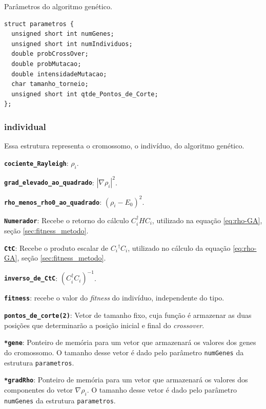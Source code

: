 	Parâmetros do algoritmo genético.
	

\vspace{1 cm}	
\begin{lstlisting}
struct parametros {
  unsigned short int numGenes;
  unsigned short int numIndividuos;
  double probCrossOver;
  double probMutacao;
  double intensidadeMutacao;
  char tamanho_torneio;
  unsigned short int qtde_Pontos_de_Corte;
};
\end{lstlisting}
\vspace{1 cm}

\subsubsection{individual}

	Essa estrutura representa o cromossomo, o indivíduo, do algoritmo genético.
	
	\textbf{\texttt{cociente\_Rayleigh}}: $\rho_i$.
	
  \textbf{\texttt{grad\_elevado\_ao\_quadrado}}: $|\nabla \rho_i|^2$.
	
  \textbf{\texttt{rho\_menos\_rho0\_ao\_quadrado}}: $(\rho_i - E_0)^2$.
	
  \textbf{\texttt{Numerador}}: Recebe o retorno do cálculo $C_i^\dagger H C_i$, utilizado na equação \ref{eq:rho-GA}, seção \ref{sec:fitness_metodo}.
  
	\textbf{\texttt{CtC}}: Recebe o produto escalar de $C{_i}^{\dag}C_i$, utilizado no cálculo da equação \ref{eq:rho-GA}, seção \ref{sec:fitness_metodo}.
  
	\textbf{\texttt{inverso\_de\_CtC}}: $(C_i^{\dag}C_i)^{-1}$.
  
	\textbf{\texttt{fitness}}: recebe o valor do \emph{fitness} do indivíduo, independente do tipo.
  
	\textbf{\texttt{pontos\_de\_corte(2)}}: Vetor de tamanho fixo, cuja função é armazenar as duas posições que determinarão a posição inicial e final do \emph{crossover}.
  
	\textbf{\texttt{*gene}}: Ponteiro de memória para um vetor que armazenará os valores dos genes do cromossomo. O tamanho desse vetor é dado pelo parâmetro \texttt{numGenes} da estrutura \texttt{parametros}.
  
	\textbf{\texttt{*gradRho}}: Ponteiro de memória para um vetor que armazenará os valores dos componentes do vetor $\nabla\rho_i$. O tamanho desse vetor é dado pelo parâmetro \texttt{numGenes} da estrutura \texttt{parametros}.
	

